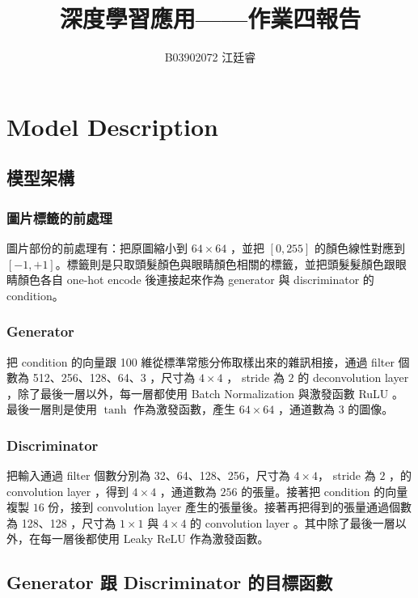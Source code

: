 \documentclass[fleqn,a4paper,12pt]{article}
\title{深度學習應用——作業四報告}
\author{B03902072 江廷睿}
\date{}
\begin{document}
\maketitle
\thispagestyle{fancy}

\section{Model Description}

\subsection{模型架構}

\subsubsection*{圖片標籤的前處理}

圖片部份的前處理有：把原圖縮小到 $64 \times 64$ ，並把 $[0, 255]$ 的顏色線性對應到 $[-1, +1]$。標籤則是只取頭髮顏色與眼睛顏色相關的標籤，並把頭髮髮顏色跟眼睛顏色各自 one-hot encode 後連接起來作為 generator 與 discriminator 的 condition。

\subsubsection*{Generator}

把 condition 的向量跟 100 維從標準常態分佈取樣出來的雜訊相接，通過 filter 個數為 512、256、128、64、3 ，尺寸為 $4 \times 4$ ， stride 為 $2$ 的 deconvolution layer ，除了最後一層以外，每一層都使用 Batch Normalization 與激發函數 RuLU  。最後一層則是使用 $\tanh$ 作為激發函數，產生 $64 \times 64$ ，通道數為 $3$ 的圖像。

\subsubsection*{Discriminator}

把輸入通過 filter 個數分別為 32、64、128、256，尺寸為 $4 \times 4$， stride 為 $2$ ，的 convolution layer ，得到 $4 \times 4$ ，通道數為 $256$ 的張量。接著把 condition 的向量複製 $16$ 份，接到 convolution layer 產生的張量後。接著再把得到的張量通過個數為 128、128 ，尺寸為 $1 \times 1$ 與 $4 \times 4$ 的 convolution layer 。其中除了最後一層以外，在每一層後都使用 Leaky ReLU 作為激發函數。

\subsection{Generator 跟 Discriminator 的目標函數}
\end{document}
